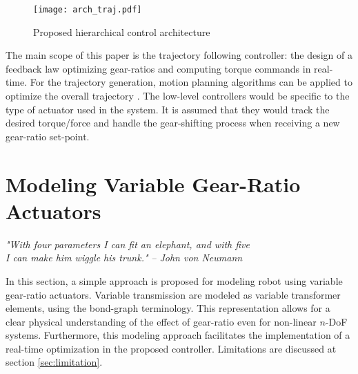 \begin{figure}[htp]
	\centering
		\texttt{[image: arch\_traj.pdf]}
	\caption{Proposed hierarchical control architecture}
	\label{fig:control_achitecture}
\end{figure}



The main scope of this paper is the trajectory following controller: the design of a feedback law optimizing gear-ratios and computing torque commands in real-time. For the trajectory generation, motion planning algorithms can be applied to optimize the overall trajectory \cite{lavalle_planning_2006}.  The low-level controllers would be specific to the type of actuator used in the system. It is assumed that they would track the desired torque/force and handle the gear-shifting process when receiving a new gear-ratio set-point. 


\newpage

\section{Modeling Variable Gear-Ratio Actuators}
\label{sec:model}

\begin{flushright}
{%
\textit{"With four parameters I can fit an elephant, and with five \\ I can make him wiggle his trunk."}
 }
 \emph{-- John von Neumann}
\end{flushright}
\vspace{+10pt}

In this section, a simple approach is proposed for modeling robot using variable gear-ratio actuators. Variable transmission are modeled as variable transformer elements, using the bond-graph terminology. This representation allows for a clear physical understanding of the effect of gear-ratio even for non-linear $n$-DoF systems. Furthermore, this modeling approach facilitates the implementation of a real-time optimization in the proposed controller. Limitations are discussed at section \ref{sec:limitation}.

